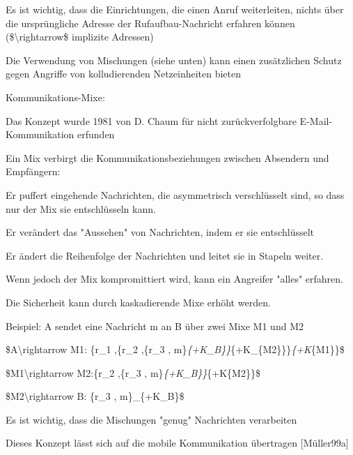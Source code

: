 \documentclass[a4paper]{article}
\begin{document}
\begin{multicols}{3}
\begin{itemize*}
\begin{itemize*}
\begin{itemize*}
                        \item Es ist wichtig, dass die Einrichtungen, die einen Anruf weiterleiten, nichts über die ursprüngliche Adresse der Rufaufbau-Nachricht erfahren können (\$\textbackslash rightarrow\$ implizite Adressen)
                        \item Die Verwendung von Mischungen (siehe unten) kann einen zusätzlichen Schutz gegen Angriffe von kolludierenden Netzeinheiten bieten
                  \end{itemize*}
            \end{itemize*}
            \item Kommunikations-Mixe:
            \begin{itemize*}
                  \item Das Konzept wurde 1981 von D. Chaum für nicht zurückverfolgbare E-Mail-Kommunikation erfunden
                  \item Ein Mix verbirgt die Kommunikationsbeziehungen zwischen Absendern und Empfängern:
                  \begin{itemize*}
                        \item Er puffert eingehende Nachrichten, die asymmetrisch verschlüsselt sind, so dass nur der Mix sie entschlüsseln kann.
                        \item Er verändert das "Aussehen" von Nachrichten, indem er sie entschlüsselt
                        \item Er ändert die Reihenfolge der Nachrichten und leitet sie in Stapeln weiter.
                        \item Wenn jedoch der Mix kompromittiert wird, kann ein Angreifer "alles" erfahren.
                  \end{itemize*}
                  \item Die Sicherheit kann durch kaskadierende Mixe erhöht werden.
                  \item Beispiel: A sendet eine Nachricht m an B über zwei Mixe M1 und M2
                  \begin{itemize*}
                        \item \$A\textbackslash rightarrow M1: \{r\_1 ,\{r\_2 ,\{r\_3 , m\}\emph{\{+K\_B\}\}}\{+K\_\{M2\}\}\}\emph{\{+K}\{M1\}\}\$
                        \item \$M1\textbackslash rightarrow M2:\{r\_2 ,\{r\_3 , m\}\emph{\{+K\_B\}\}}\{+K\{M2\}\}\$
                        \item \$M2\textbackslash rightarrow B: \{r\_3 , m\}\_\{+K\_B\}\$
                        \item Es ist wichtig, dass die Mischungen "genug" Nachrichten verarbeiten
                  \end{itemize*}
                  \item Dieses Konzept lässt sich auf die mobile Kommunikation übertragen {[}Müller99a{]}
            \end{itemize*}
      \end{itemize*}



\end{multicols}
\end{document}
